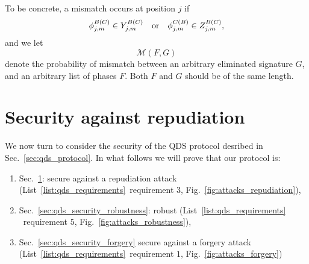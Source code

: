 To be concrete, a mismatch occurs at position $j$ if
\begin{equation}
\phi_{j, m}^{B \left(C\right)} \in Y_{j, m}^{B \left(C\right)} \qq{or} \phi_{j, m}^{C \left(B\right)} \in Z_{j, m}^{B \left(C\right)}, 
\end{equation}
and we let
\begin{equation}
\mathcal{M}\left(F, G\right)
\end{equation}
denote the probability of mismatch between an arbitrary eliminated signature $G$, and an arbitrary list of phases $F$. Both $F$ and $G$ should be of the same length.





\section{Security against repudiation}\label{sec:qds_security_repudiation}
\iffalse
In other words at the end of Step~$3$, having sent the state $\ket{\phi_{j, m}^B}\bra{\phi_{j, m}^B}$ to Bob, Alice knows that Bob holds the corresponding eliminated signature element $X_{j, m}^B$. Since Alice knows which state she sent to Bob, she may be able to guess Bob's eliminated signature element with some probability. 

 At the end of Step~$4$ however, Alice does not know whether it is Bob or Charlie who holds $X_{j, m}^B$. This uncertainty will prove crucial for preventing her from successfully repudiating (Requirement~$3$). Bob (and Charlie) now possesses an eliminated signature $\tilde{X}_m^{\left(B\right)}$ in two halves: one half ($Y_m^{\left(B\right)}$) containing those elements received directly from Alice, and one half ($Z_m^{\left(B\right)}$)containing elements received during this Symmetrization step from Charlie.
 \fi


We now turn to consider the security of the QDS protocol desribed in Sec.~\ref{sec:qds_protocol}. %
In what follows we will prove that our protocol is:
\begin{enumerate}
\item Sec.~\ref{sec:qds_security_repudiation}: secure against a repudiation attack (List~\ref{list:qds_requirements}~requirement $3$, Fig.~\ref{fig:attacks_repudiation}), 
\item Sec.~\ref{sec:qds_security_robustness}: robust (List~\ref{list:qds_requirements} ~requirement $5$, Fig.~\ref{fig:attacks_robustness}),
\item Sec.~\ref{sec:qds_security_forgery} secure against a forgery attack (List~\ref{list:qds_requirements}~requirement $1$, Fig.~\ref{fig:attacks_forgery})
\end{enumerate}

